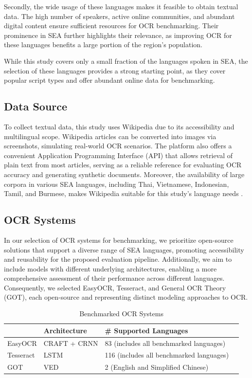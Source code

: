 \documentclass[12pt,oneside]{memoir}
\begin{document}
Secondly, the wide usage of these languages makes it feasible to obtain textual data. The high number of speakers, active online communities, and abundant digital content ensure sufficient resources for OCR benchmarking. Their prominence in SEA further highlights their relevance, as improving OCR for these languages benefits a large portion of the region's population.

While this study covers only a small fraction of the languages spoken in SEA, the selection of these languages provides a strong starting point, as they cover popular script types and offer abundant online data for benchmarking.

\subsection{Data Source}

To collect textual data, this study uses Wikipedia due to its accessibility and multilingual scope.
Wikipedia articles can be converted into images via screenshots, simulating real-world OCR scenarios. 
The platform also offers a convenient Application Programming Interface (API) that allows retrieval of plain text from most articles, serving as a reliable reference for evaluating OCR accuracy and generating synthetic documents.
Moreover, the availability of large corpora in various SEA languages, including Thai, Vietnamese, Indonesian, Tamil, and Burmese, makes Wikipedia suitable for this study's language needs \parencite{list-of-wikipedias-2024}.

\subsection{OCR Systems}

In our selection of OCR systems for benchmarking, we prioritize open-source solutions that support a diverse range of SEA languages, promoting accessibility and reusability for the proposed evaluation pipeline. 
Additionally, we aim to include models with different underlying architectures, enabling a more comprehensive assessment of their performance across different languages.
Consequently, we selected EasyOCR, Tesseract, and General OCR Theory (GOT), each open-source and representing distinct modeling approaches to OCR.

\begin{table}[ht]
    \centering
    \caption{Benchmarked OCR Systems}
    \label{table:ocr-systems}
    \begin{tabular}{llll}
        \toprule
        & Architecture & \# Supported Languages\\ 
        \midrule
        EasyOCR & CRAFT + CRNN & 83 (includes all benchmarked languages) & \\
        Tesseract & LSTM & 116 (includes all benchmarked languages)\\
        GOT & VED & 2 (English and Simplified Chinese)\\
        \bottomrule
    \end{tabular}
\end{table}
\end{document}
